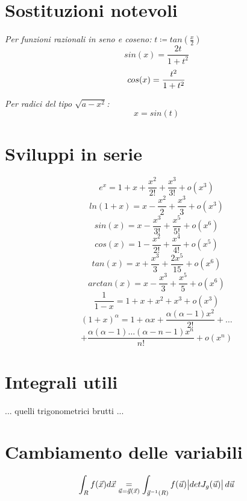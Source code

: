\documentclass[a4paper,portrait,columns=3,5pt]{cheatsheet}
\begin{document}
\section{Sostituzioni notevoli}
\textit{Per funzioni razionali in seno e coseno:} $t \coloneqq tan(\frac{x}{2}) $
$$ sin(x) = \frac{2t}{1+t^2}$$
$$ cos(x) = \frac{\-t^2}{1+t^2}$$

\textit{Per radici del tipo $\sqrt{a - x^2}$:}
$$ x = sin(t) $$

\section{Sviluppi in serie}
$$ e^x = 1 + x + \frac{x^2}{2!} + \frac{x^3}{3!} + o(x^3)$$
$$ ln(1 + x) = x - \frac{x^2}{2} + \frac{x^3}{3} + o(x^3)$$
$$ sin(x) = x - \frac{x^3}{3!} + \frac{x^5}{5!} + o(x^6)$$
$$ cos(x) = 1 - \frac{x^2}{2!} + \frac{x^4}{4!} + o(x^5)$$
$$ tan(x) = x + \frac{x^3}{3} + \frac{2x^5}{15} + o(x^6)$$
$$ arctan(x) = x - \frac{x^3}{3} + \frac{x^5}{5} + o(x^6)$$
$$ \frac{1}{1-x} = 1 + x + x^2 + x^3 + o(x^3)$$
$$(1 + x) ^ \alpha = 1 + \alpha x + \frac{\alpha (\alpha - 1)x^2}{2!} + \dots $$
$$ + \frac{\alpha(\alpha - 1)\dots (\alpha - n - 1) x^n}{n!} + o(x^n) $$

\section{Integrali utili}
... quelli trigonometrici brutti ...

\section{Cambiamento delle variabili}
\begin{equation*}
	\int_R f(\vec {x}) d\vec{x} \underset{{\vec{u} = \vec{g} (\vec{x})}}{=} \int_{\vec{g}^{-1}(R)} f(\vec {u}) \abs{det J_g(\vec u)} d\vec{u}
\end{equation*}
\end{document}
